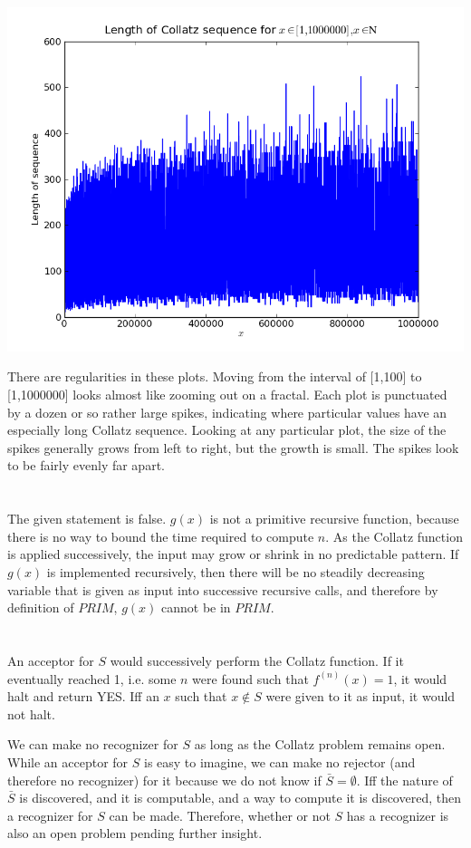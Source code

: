 \documentclass{article}
\begin{document}
\includegraphics[scale=0.5]{col1000000.png}

There are regularities in these plots. Moving from the interval of [1,100] to
[1,1000000] looks almost like zooming out on a fractal. Each plot is punctuated
by a dozen or so rather large spikes, indicating where particular values have
an especially
long Collatz sequence. Looking at any particular plot, the size of the spikes
generally grows from left to right, but the growth is small. The
spikes look to be fairly evenly far apart.

\section{}
The given statement is false. $g(x)$ is not a primitive recursive function,
because there is no way to bound the time required to compute $n$. As the
Collatz function is applied successively, the input may grow or shrink in no
predictable pattern. If $g(x)$ is implemented recursively, then there
will be no steadily decreasing variable that is given as input into successive
recursive calls, and therefore by definition of $PRIM$, $g(x)$ cannot be in
$PRIM$.

\section{}
An acceptor for $S$ would successively perform the Collatz function. If it
eventually
reached 1, i.e. some $n$ were found such that $f^{(n)}(x)=1$, it would halt and
return YES. Iff an $x$ such that $x \notin S$ were
given to it as input, it would not halt.

\vspace{1em}

We can make no recognizer for $S$ as long as the Collatz problem remains open.
While an acceptor for $S$ is easy to imagine, we can make no rejector
(and therefore no recognizer) for it because we do not know if
$\bar S = \emptyset$. Iff the nature of
$\bar S$ is discovered, and it is computable, and a way to compute it is
discovered, then a recognizer for $S$ can be made. Therefore, whether or not
$S$ has a recognizer is also an open problem pending further insight.
\end{document}
